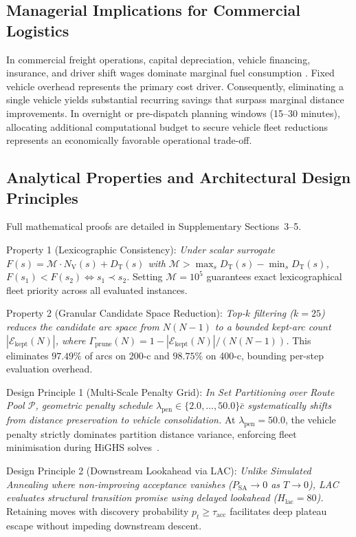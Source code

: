 \documentclass{ieeeaccess}
\newcommand{\NV}{{N_\mathrm{V}}}
\newcommand{\TD}{{D_\mathrm{T}}}
\begin{document}
\subsection{Managerial Implications for Commercial Logistics}
\label{sec:disc_managerial}

In commercial freight operations, capital depreciation, vehicle financing, insurance, and driver shift wages dominate marginal fuel consumption \cite{Toth2014, braysy2005vehicle}. Fixed vehicle overhead represents the primary cost driver. Consequently, eliminating a single vehicle yields substantial recurring savings that surpass marginal distance improvements. In overnight or pre-dispatch planning windows (15--30 minutes), allocating additional computational budget to secure vehicle fleet reductions represents an economically favorable operational trade-off.

\subsection{Analytical Properties and Architectural Design Principles}
\label{sec:disc_theory}
Full mathematical proofs are detailed in Supplementary Sections~3--5.

Property 1 (Lexicographic Consistency): \textit{Under scalar surrogate $F(s) = \mathcal{M} \cdot \NV(s) + \TD(s)$ with $\mathcal{M} > \max_{s} \TD(s) - \min_{s} \TD(s)$, $F(s_1) < F(s_2) \iff s_1 \prec s_2$.} Setting $\mathcal{M} = 10^5$ guarantees exact lexicographical fleet priority across all evaluated instances.

Property 2 (Granular Candidate Space Reduction): \textit{Top-$k$ filtering ($k=25$) reduces the candidate arc space from $N(N-1)$ to a bounded kept-arc count $|\mathcal{E}_{\text{kept}}(N)|$, where $\Gamma_{\text{prune}}(N) = 1 - |\mathcal{E}_{\text{kept}}(N)|/(N(N-1))$.} This eliminates $97.49\%$ of arcs on 200-c and $98.75\%$ on 400-c, bounding per-step evaluation overhead.

Design Principle 1 (Multi-Scale Penalty Grid): \textit{In Set Partitioning over Route Pool $\mathcal{P}$, geometric penalty schedule $\lambda_{\text{pen}} \in \{2.0, \dots, 50.0\}\bar{c}$ systematically shifts from distance preservation to vehicle consolidation.} At $\lambda_{\text{pen}}=50.0$, the vehicle penalty strictly dominates partition distance variance, enforcing fleet minimisation during HiGHS solves~\cite{huangfu2018parallelizing}.

Design Principle 2 (Downstream Lookahead via LAC): \textit{Unlike Simulated Annealing where non-improving acceptance vanishes ($P_{\text{SA}} \to 0$ as $T \to 0$), LAC evaluates structural transition promise using delayed lookahead ($H_{\text{lac}} = 80$).} Retaining moves with discovery probability $p_t \ge \tau_{\text{acc}}$ facilitates deep plateau escape without impeding downstream descent.
\end{document}

